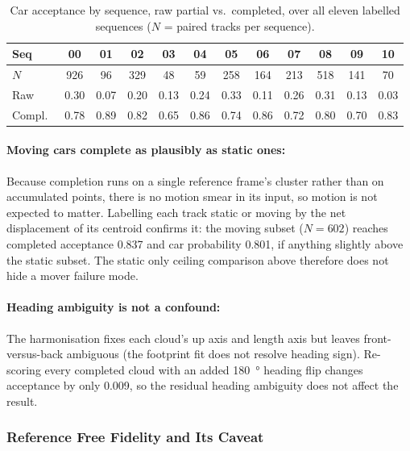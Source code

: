 \documentclass[a4paper,12pt]{report}
\begin{document}
\begin{table}[H]
  \centering
  \caption[Plausibility acceptance by sequence]{Car acceptance by sequence, raw partial vs.\
    completed, over all eleven labelled sequences ($N$ = paired tracks per sequence).}
  \label{tab:plausibility-seq}
  \small
  \setlength{\tabcolsep}{4.5pt}
  \begin{tabular}{lccccccccccc}
    \toprule
    Seq & 00 & 01 & 02 & 03 & 04 & 05 & 06 & 07 & 08 & 09 & 10 \\
    \midrule
    $N$ & 926 & 96 & 329 & 48 & 59 & 258 & 164 & 213 & 518 & 141 & 70 \\
    Raw & 0.30 & 0.07 & 0.20 & 0.13 & 0.24 & 0.33 & 0.11 & 0.26 & 0.31 & 0.13 & 0.03 \\
    Compl.\ & 0.78 & 0.89 & 0.82 & 0.65 & 0.86 & 0.74 & 0.86 & 0.72 & 0.80 & 0.70 & 0.83 \\
    \bottomrule
  \end{tabular}
\end{table}

\paragraph{Moving cars complete as plausibly as static ones:}
\label{sec:results-movers}
Because completion runs on a single reference frame's cluster rather than on accumulated
points, there is no motion smear in its input, so motion is not expected to matter. Labelling
each track static or moving by the net displacement of its centroid confirms it: the moving
subset ($N=\num{602}$) reaches completed acceptance \num{0.837} and car probability
\num{0.801}, if anything slightly above the static subset. The static only ceiling comparison
above therefore does not hide a mover failure mode.

\paragraph{Heading ambiguity is not a confound:} The harmonisation fixes each cloud's up axis
and length axis but leaves front-versus-back ambiguous (the footprint fit does not resolve
heading sign). Re-scoring every completed cloud with an added \SI{180}{\degree} heading flip
changes acceptance by only \num{0.009}, so the residual heading ambiguity does not affect the
result.

\subsubsection{Reference Free Fidelity and Its Caveat}
\label{sec:results-fidelity}
\end{document}
